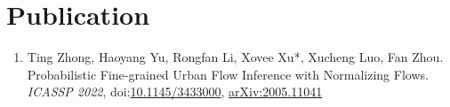 \section*{Publication}


\begin{enumerate}[resume]
    \item Ting Zhong, Haoyang Yu, Rongfan Li, Xovee Xu*, Xucheng Luo, Fan Zhou. Probabilistic Fine-grained Urban Flow Inference with Normalizing Flows. \textit{ICASSP 2022}, doi:\href{https://xovee.cn/html/paper-redirects/csur2021.html}{10.1145/3433000}, \href{https://arxiv.org/abs/2005.11041}{arXiv:2005.11041}
\end{enumerate}


\begin{enumerate}[resume]
\end{enumerate}